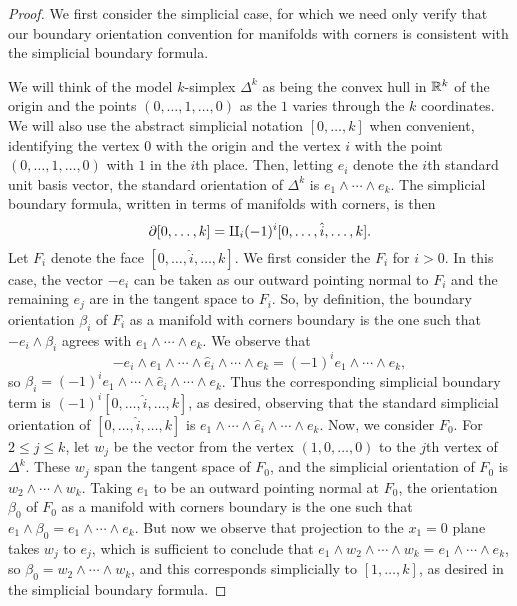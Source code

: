 \begin{proof}
	We first consider the simplicial case, for which we need only verify that our boundary orientation convention for manifolds with corners is consistent with the simplicial boundary formula.

	We will think of the model $k$-simplex $\Delta^k$ as being the convex hull in $\mathbb{R}^k$ of the origin and the points $(0, \ldots , 1, \ldots, 0)$ as the $1$ varies through the $k$ coordinates.
	We will also use the abstract simplicial notation $[0,\ldots,k]$ when convenient, identifying the vertex $0$ with the origin and the vertex $i$ with the point $(0, \ldots , 1, \ldots, 0)$ with $1$ in the $i$th place.
	Then, letting $e_i$ denote the $i$th standard unit basis vector, the standard orientation of $\Delta^k$ is $e_1 \wedge \cdots \wedge e_k$.
	The simplicial boundary formula, written in terms of manifolds with corners, is then
	\[\partial [0,\ldots,k] = \amalg_i (-1)^i [0,\ldots, \hat i,\ldots, k].\]
	Let $F_i$ denote the face $[0,\ldots, \hat i,\ldots, k]$.
	We first consider the $F_i$ for $i > 0$.
	In this case, the vector $-e_i$ can be taken as our outward pointing normal to $F_i$ and the remaining $e_j$ are in the tangent space to $F_i$.
	So, by definition, the boundary orientation $\beta_i$ of $F_i$ as a manifold with corners boundary is the one such that $-e_i \wedge \beta_i$ agrees with $e_1 \wedge \cdots \wedge e_k$.
	We observe that
	\[ -e_i \wedge e_1 \wedge \cdots \wedge \hat e_i \wedge \cdots \wedge e_k = (-1)^ie_1 \wedge \cdots \wedge e_k,\]
	so $\beta_i = (-1)^i e_1 \wedge \cdots \wedge \hat e_i \wedge \cdots \wedge e_k$.
	Thus the corresponding simplicial boundary term is $(-1)^i [0,\ldots, \hat i,\ldots, k]$, as desired, observing that the standard simplicial orientation of $[0,\ldots, \hat i,\ldots, k]$ is $e_1 \wedge \cdots \wedge \hat e_i \wedge \cdots \wedge e_k$.
	Now, we consider $F_0$.
	For $2\leq j\leq k$, let $w_j$ be the vector from the vertex $(1,0,\ldots,0)$ to the $j$th vertex of $\Delta^k$.
 	These $w_j$ span the tangent space of $F_0$, and the simplicial orientation of $F_0$ is $w_2 \wedge \cdots \wedge w_k$.
	Taking $e_1$ to be an outward pointing normal at $F_0$, the orientation $\beta_0$ of $F_0$ as a manifold with corners boundary is the one such that $e_1 \wedge \beta_0 = e_1 \wedge \cdots \wedge e_k$.
	But now we observe that projection to the $x_1 = 0$ plane takes $w_j$ to $e_j$, which is sufficient to conclude that $e_1 \wedge w_2 \wedge \cdots \wedge w_k = e_1 \wedge \cdots \wedge e_k$, so $\beta_0 = w_2 \wedge \cdots \wedge w_k$, and this corresponds simplicially to $[1,\ldots, k]$, as desired in the simplicial boundary formula.


\end{proof}
